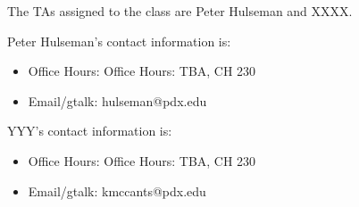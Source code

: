 The TAs assigned to the class are Peter Hulseman and XXXX. 

Peter Hulseman's contact information is:
\begin{itemize}
 \item Office Hours: Office Hours: TBA, CH 230
 \item Email/gtalk: hulseman@pdx.edu
\end{itemize}

YYY's contact information is:
\begin{itemize}
 \item Office Hours: Office Hours: TBA, CH 230
 \item Email/gtalk: kmccants@pdx.edu
\end{itemize}

